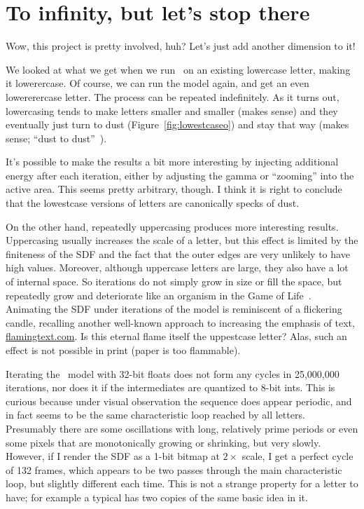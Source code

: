 \documentclass[twocolumn]{article}
\begin{document}
\section{To infinity, but let's stop there} \label{sec:lowestcase}

Wow, this project is pretty involved, huh? Let's just add another
dimension to it!

We looked at what we get when we run \makelowercase\ on an existing
lowercase letter, making it lowerercase. Of course, we can run the
model again, and get an even lowererercase letter. The process can be
repeated indefinitely. As it turns out, lowercasing tends to make
letters smaller and smaller (makes sense) and they eventually just
turn to dust (Figure~\ref{fig:lowestcaseo}) and stay that way (makes
sense; ``dust to dust''~\cite{commonprayerburial}). 

It's possible to make the results a bit more interesting by injecting
additional energy after each iteration, either by adjusting the gamma
or ``zooming'' into the active area. This seems pretty arbitrary,
though. I think it is right to conclude that the lowestcase versions
of letters are canonically specks of dust.

On the other hand, repeatedly uppercasing produces more interesting
results. Uppercasing usually increases the scale of a letter, but this
effect is limited by the finiteness of the SDF and the fact that the
outer edges are very unlikely to have high values. Moreover, although
uppercase letters are large, they also have a lot of internal space.
So iterations do not simply grow in size or fill the space, but
repeatedly grow and deteriorate like an organism in the Game of
Life~\cite{games1970fantastic}. Animating the SDF under iterations of
the model is reminiscent of a flickering candle, recalling another
well-known approach to increasing the emphasis of text,
\url{flamingtext.com}. Is this eternal flame itself the uppestcase
letter? Alas, such an effect is not possible in print (paper is too
flammable).

Iterating the \makeuppercase\ model with 32-bit floats does not form
any cycles in 25,000,000 iterations, nor does it if the intermediates
are quantized to 8-bit ints. This is curious because under visual
observation the sequence does appear periodic, and in fact seems to be
the same characteristic loop reached by all letters. Presumably there
are some oscillations with long, relatively prime periods or even some
pixels that are monotonically growing or shrinking, but very slowly.
However, if I render the SDF as a 1-bit bitmap at $2\times$ scale, I
get a perfect cycle of 132 frames, which appears to be two passes
through the main characteristic loop, but slightly different each
time. This is not a strange property for a letter to have; for example
a typical  has two copies of the same basic idea in it.
\end{document}
